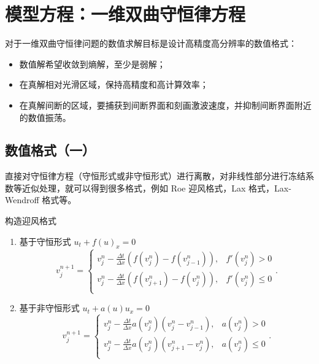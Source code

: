 \chapter{模型方程：一维双曲守恒律方程}


对于一维双曲守恒律问题的数值求解目标是设计高精度高分辨率的数值格式：
\begin{itemize}
    \item 数值解希望收敛到熵解，至少是弱解；
    \item 在真解相对光滑区域，保持高精度和高计算效率；
    \item 在真解间断的区域，要捕获到间断界面和刻画激波速度，并抑制间断界面附近的数值振荡。
\end{itemize}


\section{数值格式（一）}

直接对守恒律方程（守恒形式或非守恒形式）进行离散，对非线性部分进行冻结系数等近似处理，就可以得到很多格式，例如 Roe 迎风格式，Lax 格式，Lax-Wendroff 格式等。
\begin{example}
    构造迎风格式
    \begin{enumerate}
        \item 基于守恒形式 $u_t + f(u)_x = 0$
              \[
                  v_j^{n+1} =
                  \begin{cases}
                      v_j^n - \frac{\Delta t}{\Delta x}\left(f(v_{j}^n)-f(v_{j-1}^n)\right), & f'(v_j^n) > 0   \\
                      v_j^n - \frac{\Delta t}{\Delta x}\left(f(v_{j+1}^n)-f(v_{j}^n)\right), & f'(v_j^n) \le 0 \\
                  \end{cases}.
              \]
        \item 基于非守恒形式 $u_t + a(u) u_x = 0$
              \[
                  v_j^{n+1} =
                  \begin{cases}
                      v_j^n - \frac{\Delta t}{\Delta x} a(v_j^n) \left(v_{j}^n-v_{j-1}^n\right), & a(v_j^n) > 0   \\
                      v_j^n - \frac{\Delta t}{\Delta x} a(v_j^n) \left(v_{j+1}^n-v_{j}^n\right), & a(v_j^n) \le 0 \\
                  \end{cases}.
              \]
    \end{enumerate}
\end{example}


